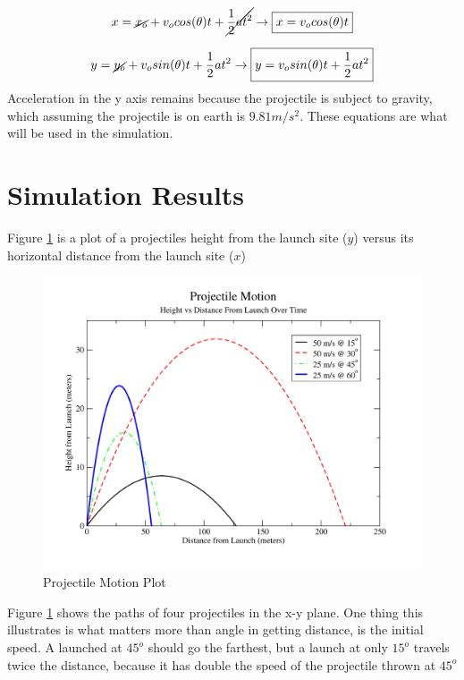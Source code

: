\documentclass{article}
\begin{document}
\begin{equation}
\label{eq:15}
x = \cancel{x_o} +  v_o  cos(\theta) t + \cancel{\dfrac{1}{2}at^2} \rightarrow
\boxed{x = v_o  cos(\theta) t}
\end{equation}

\begin{equation}
\label{eq:16}
y = \cancel{y_o} + v_o  sin(\theta) t + \dfrac{1}{2}at^2 \rightarrow
\boxed{y = v_o  sin(\theta) t + \dfrac{1}{2}at^2}
\end{equation}
Acceleration in the y axis remains because the projectile is subject to gravity, which assuming the projectile is on earth is $9.81 m/s^2$. These equations are what will be used in the simulation.

\pagebreak
\section{Simulation Results}
Figure \ref{fig:1} is a plot of a projectiles height from the launch site ($y$) versus its horizontal distance from the launch site ($x$)

\begin{figure}[H]
\begin{center}
\includegraphics[scale=0.65]{./motion}
\end{center}
\caption{Projectile Motion Plot}
\label{fig:1}
\end{figure} 
\noindent 
Figure \ref{fig:1} shows the paths of four projectiles in the x-y plane. One thing this illustrates is what matters more than angle in getting distance, is the initial speed. A launched at $45^o$ should go the farthest, but a launch at only $15^o$ travels twice the distance, because it has double the speed of the projectile thrown at $45^o$ 
\end{document}

